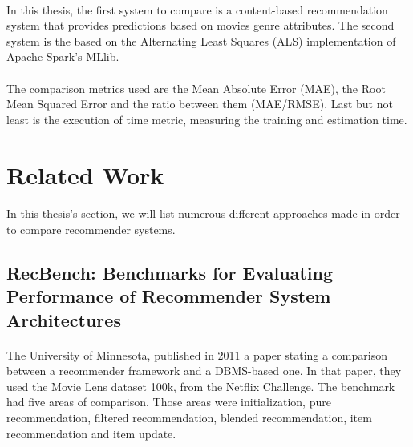 \paragraph{} In this thesis, the first system to compare is a content-based recommendation system that provides predictions based on movies genre attributes. The second system is the based on the Alternating Least Squares (ALS) implementation of Apache Spark's MLlib.

\paragraph{} The comparison metrics used are the Mean Absolute Error (MAE), the Root Mean Squared Error and the ratio between them (MAE/RMSE). Last but not least is the execution of time metric, measuring the training and estimation time.

\section{Related Work}
\paragraph{} In this thesis's section, we will list numerous different approaches made in order to compare recommender systems.

\subsection{RecBench: Benchmarks for Evaluating Performance of Recommender System Architectures \cite{levandoski2011recbench}}
\paragraph{} The University of Minnesota, published in 2011 a paper stating a comparison between a recommender framework and a DBMS-based one. In that paper, they used the Movie Lens dataset 100k, from the Netflix Challenge. The benchmark had five areas of comparison. Those areas were initialization, pure recommendation, filtered recommendation, blended recommendation, item recommendation and item update.

